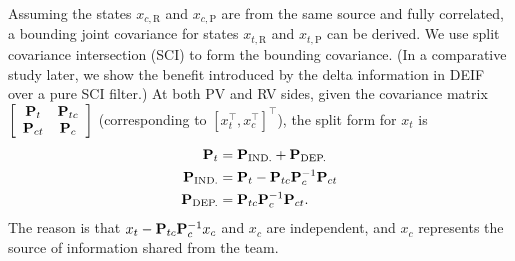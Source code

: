Assuming the states ${x}_{c,\text{R}}$ and ${x}_{c,\text{P}}$ are from the same source and fully correlated, a bounding joint covariance for states ${x}_{t,\text{R}}$ and  ${x}_{t,\text{P}}$ can be derived. We use split covariance intersection (SCI) \cite{Lihao2013A} to form the bounding covariance. (In a comparative study later, we show the benefit introduced by the delta information in DEIF over a pure SCI filter.) At both PV and RV sides, given the covariance matrix $\left[
            \begin{array}{cc}
              {\bf P}_t &  {\bf P}_{tc} \\
              {\bf P}_{ct} & {\bf P}_c \\
            \end{array}
          \right]$ (corresponding to $[{x}_t^\top,{x}_c^\top]^\top$), the split form for ${x}_t$ is
          \begin{equation}
          \begin{split}
          {\bf P}_t&={\bf P}_\text{IND.}+{\bf P}_\text{DEP.} \\
          {\bf P}_\text{IND.}&={\bf P}_t-{\bf P}_{tc}{\bf P}_c^{-1}{\bf P}_{ct} \\
          {\bf P}_\text{DEP.}&={\bf P}_{tc}{\bf P}_c^{-1}{\bf P}_{ct}. \\
          \end{split}
          \end{equation}
          The reason is that $x_t-{\bf P}_{tc}{\bf P}_c^{-1}x_c$ and $x_c$ are independent, and $x_c$ represents the source of information shared from the team.

